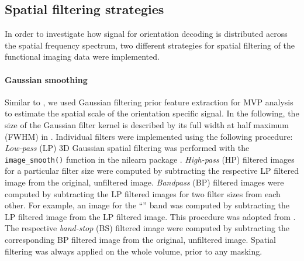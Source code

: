 \subsection*{Spatial filtering strategies}

\noindent In order to investigate how signal for orientation
decoding is distributed across the spatial frequency spectrum, two different
strategies for spatial filtering of the functional imaging data were
implemented.

\paragraph{Gaussian smoothing}
%
Similar to \citet{swisher_2010}, we used Gaussian filtering prior feature
extraction for MVP analysis to estimate the spatial scale of the orientation
specific signal. In the following, the size of the Gaussian filter kernel is
described by its full width at half maximum (FWHM) in \mm{}. Individual
filters were implemented using the following procedure: \textit{Low-pass} (LP)
3D Gaussian spatial filtering was performed with the \texttt{image\_smooth()}
function in the nilearn package \citep{pedregosa_2011}. \textit{High-pass}
(HP) filtered images for a particular filter size were computed by subtracting
the respective LP filtered image from the original, unfiltered image.
\textit{Bandpass} (BP) filtered images were computed by subtracting the LP
filtered images for two filter sizes from each other. For example, an image
for the ``'' band was computed by subtracting the  LP filtered
image from the  LP filtered image. This procedure was adopted from
\citet{alink_2013}. The respective \textit{band-stop} (BS) filtered image were
computed by subtracting the corresponding BP filtered image from the original,
unfiltered image. Spatial filtering was always applied on the whole volume,
prior to any masking.


